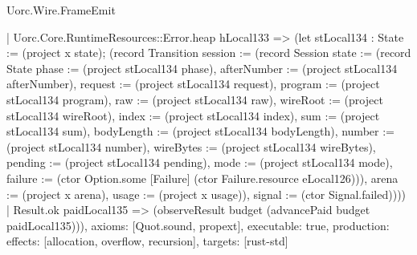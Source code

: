 \begin{lexlean}{Uorc.Wire.FrameEmit}
\begin{semanticmodule}
{      | Uorc.Core.RuntimeResources::Error.heap hLocal133 => (let stLocal134 : State := (project x state); (record Transition {session := (record Session {state := (record State {phase := (project stLocal134 phase), afterNumber := (project stLocal134 afterNumber), request := (project stLocal134 request), program := (project stLocal134 program), raw := (project stLocal134 raw), wireRoot := (project stLocal134 wireRoot), index := (project stLocal134 index), sum := (project stLocal134 sum), bodyLength := (project stLocal134 bodyLength), number := (project stLocal134 number), wireBytes := (project stLocal134 wireBytes), pending := (project stLocal134 pending), mode := (project stLocal134 mode), failure := (ctor Option.some [Failure] (ctor Failure.resource eLocal126))}), arena := (project x arena), usage := (project x usage)}), signal := (ctor Signal.failed)})))
    | Result.ok paidLocal135 => (observeResult budget (advancePaid budget paidLocal135))),
  axioms: [Quot.sound, propext],
  executable: true,
  production: {effects: [allocation, overflow, recursion], targets: [rust-std]}
}


\end{semanticmodule}
\end{lexlean}
